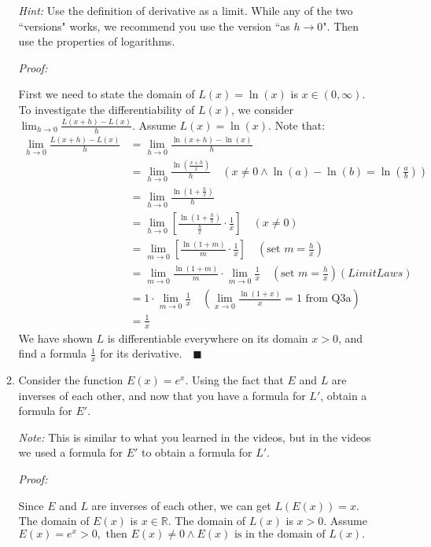 \documentclass[12pt]{exam}
\newcommand {\DS} [1] {${\displaystyle #1}$}
\newcommand{\vv}{\vspace{.1cm}}
\newcommand{\R}{\mathbb{R}}
\begin{document}
\begin{enumerate}
\begin{enumerate}
			\emph{Hint:}  Use the definition of derivative as a limit.  While any of the two ``versions" works, we recommend you use the version ``as $h \to 0$".  Then use the properties of logarithms.
		\vv
		
		\emph{Proof:}
		
		\vv
		
		First we need to state the domain of $L(x)=\ln(x)$ is $x\in(0,\infty).$
		To investigate the differentiability of $L(x)$, we consider \DS{\lim_{h \to 0} \frac{L(x+h)-L(x)}{h}.} Assume $L(x)=\ln(x).$ Note that:
		\begin{align*}
		    \lim_{h \to 0} \frac{L(x+h)-L(x)}{h}&=\lim_{h \to 0} \frac{\ln(x+h)-\ln(x)}{h}\\
		    &=\lim_{h \to 0} \frac{\ln(\frac{x+h}{x})}{h}\quad(x\neq0 \land \ln(a)-\ln(b)=\ln(\frac{a}{b}))\\
		    &=\lim_{h \to 0} \frac{\ln(1+\frac{h}{x})}{h}\\
		    &=\lim_{h \to 0}[ \frac{\ln(1+\frac{h}{x})}{\frac{h}{x}}\cdot\frac{1}{x}]\quad(x\neq0)\\
		    &=\lim_{m \to 0}[ \frac{\ln(1+m)}{m}\cdot\frac{1}{x}]\quad(\mbox{set } m=\frac{h}{x})\\
		    &=\lim_{m \to 0} \frac{\ln(1+m)}{m}\cdot\lim_{m \to 0}\frac{1}{x}\quad(\mbox{set } m=\frac{h}{x})(Limit Laws)\\
		    &=1\cdot\lim_{m \to 0}\frac{1}{x}\quad(\lim_{x \to 0} \frac{\ln (1+x)}{x} = 1 \mbox{ from Q3a})\\
		    &=\frac{1}{x}
		\end{align*}
		We have shown $L$ is differentiable everywhere on its domain $x>0$, and find a formula $\frac{1}{x}$ for its derivative.$\quad\blacksquare$
		
		\item  Consider the function \DS{E(x) = e^x}.  Using the fact that $E$ and $L$ are inverses of each other, and now that you have a formula for $L'$, obtain a formula for $E'$.
		
			\emph{Note:}  This is similar to what you learned in the videos, but in the videos we used a formula for $E'$ to obtain a formula for $L'$.
	    \vv
	    
	    \emph{Proof:}
	    
	    \vv
	    
	    Since $E$ and $L$ are inverses of each other, we can get $L(E(x))=x.$ The domain of $E(x)$ is $x\in\R.$ The domain of $L(x)$ is $x > 0.$ Assume $E(x)=e^x>0,\mbox{ then } E(x)\neq0 \land E(x)\mbox{ is in the domain of } L(x).$
	    

\end{enumerate}
\end{enumerate}
\end{document}
